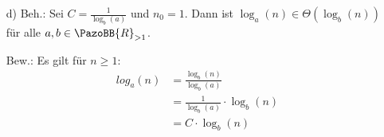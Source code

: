 \documentclass[12pt]{article}
\newcommand {\R}{\PazoBB{R}}   %
\begin{document}
\begin{enumerate}
\item[d) Beh.:] Sei $C = \frac 1 {\log_b(a)}$ und $n_0 = 1$. Dann ist $\log_a(n) \in \Theta( \log_b(n))$ für alle $a,b \in \R_{>1}$.
\item[Bew.:] Es gilt für $n\geq 1$:
   \begin{align*}
                                                    log_a(n)                      &  = \frac {\log_b(n)} {\log_b(a)}         \\
                                                                                       &  = \frac 1 {\log_b(a)}\cdot \log_b(n)  \\
                                                                                       & =  C \cdot \log_b(n)  \\
   \end{align*}
\end{enumerate}
\end{document}
